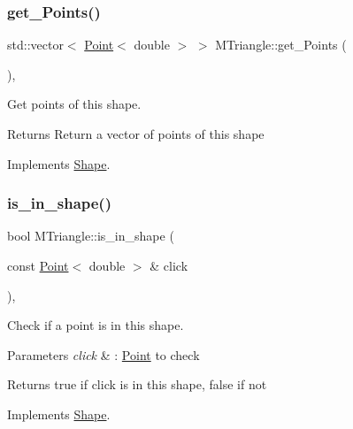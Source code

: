\subsubsection{\texorpdfstring{get\+\_\+\+Points()}{get\_Points()}}
{\footnotesize\ttfamily std\+::vector$<$ \hyperlink{classPoint}{Point}$<$ double $>$ $>$ M\+Triangle\+::get\+\_\+\+Points (\begin{DoxyParamCaption}{ }\end{DoxyParamCaption})\hspace{0.3cm}{\ttfamily [override]}, {\ttfamily [virtual]}}



Get points of this shape. 

\begin{DoxyReturn}{Returns}
Return a vector of points of this shape 
\end{DoxyReturn}


Implements \hyperlink{classShape_add74a5c682840fa4a519242b1ddbd0b5}{Shape}.

\mbox{\label{classMTriangle_a4cc4cd63537ead67a0b68d1ab25111b4}} 
\subsubsection{\texorpdfstring{is\+\_\+in\+\_\+shape()}{is\_in\_shape()}}
{\footnotesize\ttfamily bool M\+Triangle\+::is\+\_\+in\+\_\+shape (\begin{DoxyParamCaption}\item[{const \hyperlink{classPoint}{Point}$<$ double $>$ \&}]{click }\end{DoxyParamCaption})\hspace{0.3cm}{\ttfamily [override]}, {\ttfamily [virtual]}}



Check if a point is in this shape. 


\begin{DoxyParams}{Parameters}
{\em click} & \+: \hyperlink{classPoint}{Point} to check \\
\hline
\end{DoxyParams}
\begin{DoxyReturn}{Returns}
true if click is in this shape, false if not 
\end{DoxyReturn}


Implements \hyperlink{classShape_aa09a621da090e42840b4bec7ffb27620}{Shape}.

